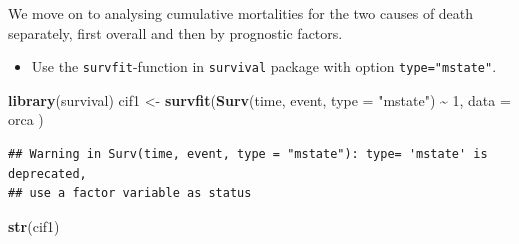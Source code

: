 \documentclass[
]{book}
\newenvironment{Shaded}{\begin{snugshade}}{\end{snugshade}}
\newcommand{\AttributeTok}[1]{\textcolor[rgb]{0.13,0.29,0.53}{#1}}
\newcommand{\DecValTok}[1]{\textcolor[rgb]{0.00,0.00,0.81}{#1}}
\newcommand{\FunctionTok}[1]{\textcolor[rgb]{0.13,0.29,0.53}{\textbf{#1}}}
\newcommand{\NormalTok}[1]{#1}
\newcommand{\OtherTok}[1]{\textcolor[rgb]{0.56,0.35,0.01}{#1}}
\newcommand{\SpecialCharTok}[1]{\textcolor[rgb]{0.81,0.36,0.00}{\textbf{#1}}}
\newcommand{\StringTok}[1]{\textcolor[rgb]{0.31,0.60,0.02}{#1}}
\providecommand{\tightlist}{%
  \setlength{\itemsep}{0pt}\setlength{\parskip}{0pt}}
\theoremstyle{definition}
\theoremstyle{definition}
\theoremstyle{definition}
\theoremstyle{definition}
\theoremstyle{remark}
\begin{document}
We move on to analysing cumulative mortalities for the two causes of
death separately, first overall and then by prognostic factors.

\begin{itemize}
\tightlist
\item
  Use the \texttt{survfit}-function in \texttt{survival} package with option
  \texttt{type="mstate"}.
\end{itemize}

\begin{Shaded}
\begin{Highlighting}[]
\FunctionTok{library}\NormalTok{(survival)}
\NormalTok{cif1 }\OtherTok{\textless{}{-}} \FunctionTok{survfit}\NormalTok{(}\FunctionTok{Surv}\NormalTok{(time, event, }\AttributeTok{type =} \StringTok{"mstate"}\NormalTok{) }\SpecialCharTok{\textasciitilde{}} \DecValTok{1}\NormalTok{,}
  \AttributeTok{data =}\NormalTok{ orca}
\NormalTok{)}
\end{Highlighting}
\end{Shaded}

\begin{verbatim}
## Warning in Surv(time, event, type = "mstate"): type= 'mstate' is deprecated,
## use a factor variable as status
\end{verbatim}

\begin{Shaded}
\begin{Highlighting}[]
\FunctionTok{str}\NormalTok{(cif1)}
\end{Highlighting}
\end{Shaded}
\end{document}

